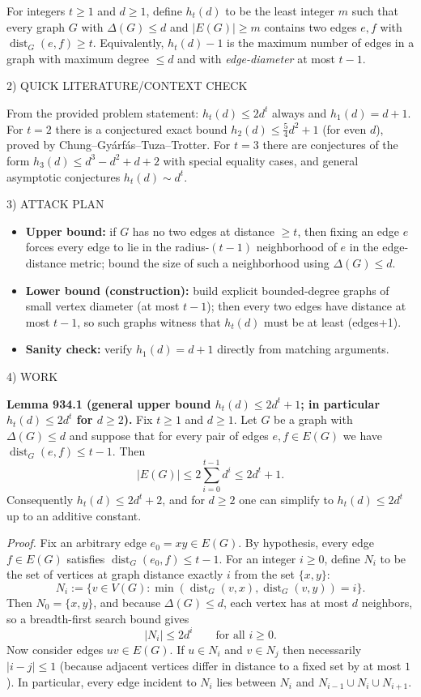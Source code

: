 For integers $t\ge 1$ and $d\ge 1$, define $h_t(d)$ to be the least integer $m$ such that every graph $G$ with $\Delta(G)\le d$ and $|E(G)|\ge m$ contains two edges $e,f$ with $\operatorname{dist}_G(e,f)\ge t$.
Equivalently, $h_t(d)-1$ is the maximum number of edges in a graph with maximum degree $\le d$ and with \emph{edge-diameter} at most $t-1$.

2) QUICK LITERATURE/CONTEXT CHECK

From the provided problem statement: $h_t(d)\le 2d^t$ always and $h_1(d)=d+1$.
For $t=2$ there is a conjectured exact bound $h_2(d)\le \tfrac54 d^2+1$ (for even $d$), proved by Chung--Gy\'arf\'as--Tuza--Trotter.
For $t=3$ there are conjectures of the form $h_3(d)\le d^3-d^2+d+2$ with special equality cases, and general asymptotic conjectures $h_t(d)\sim d^t$.

3) ATTACK PLAN

\begin{itemize}
\item \textbf{Upper bound:} if $G$ has no two edges at distance $\ge t$, then fixing an edge $e$ forces every edge to lie in the radius-$(t-1)$ neighborhood of $e$ in the edge-distance metric; bound the size of such a neighborhood using $\Delta(G)\le d$.
\item \textbf{Lower bound (construction):} build explicit bounded-degree graphs of small vertex diameter (at most $t-1$); then every two edges have distance at most $t-1$, so such graphs witness that $h_t(d)$ must be at least (edges+1).
\item \textbf{Sanity check:} verify $h_1(d)=d+1$ directly from matching arguments.
\end{itemize}

4) WORK

\textbf{Lemma 934.1 (general upper bound $h_t(d)\le 2d^t+1$; in particular $h_t(d)\le 2d^t$ for $d\ge 2$).}
Fix $t\ge 1$ and $d\ge 1$.
Let $G$ be a graph with $\Delta(G)\le d$ and suppose that for every pair of edges $e,f\in E(G)$ we have $\operatorname{dist}_G(e,f)\le t-1$.
Then
\[
|E(G)|\le 2\sum_{i=0}^{t-1} d^{i} \le 2d^t+1.
\]
Consequently $h_t(d)\le 2d^t+2$, and for $d\ge 2$ one can simplify to $h_t(d)\le 2d^t$ up to an additive constant.

\emph{Proof.}
Fix an arbitrary edge $e_0=xy\in E(G)$. By hypothesis, every edge $f\in E(G)$ satisfies $\operatorname{dist}_G(e_0,f)\le t-1$.
For an integer $i\ge 0$, define $N_i$ to be the set of vertices at graph distance exactly $i$ from the set $\{x,y\}$:
\[
N_i:=\{v\in V(G): \min(\operatorname{dist}_G(v,x),\operatorname{dist}_G(v,y))=i\}.
\]
Then $N_0=\{x,y\}$, and because $\Delta(G)\le d$, each vertex has at most $d$ neighbors, so a breadth-first search bound gives
\[
|N_i|\le 2d^i\qquad\text{for all }i\ge 0.
\]
Now consider edges $uv\in E(G)$.
If $u\in N_i$ and $v\in N_j$ then necessarily $|i-j|\le 1$ (because adjacent vertices differ in distance to a fixed set by at most $1$). In particular, every edge incident to $N_i$ lies between $N_i$ and $N_{i-1}\cup N_i\cup N_{i+1}$.

